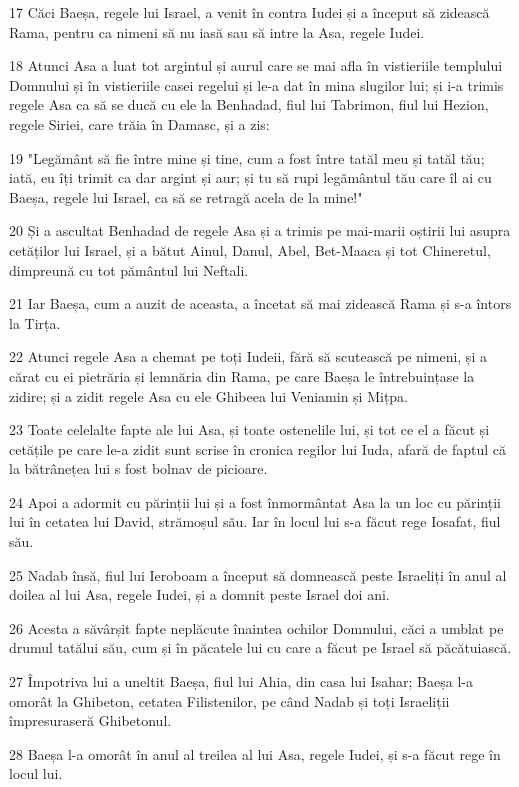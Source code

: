 \par 17 Căci Baeșa, regele lui Israel, a venit în contra Iudei și a început să zidească Rama, pentru ca nimeni să nu iasă sau să intre la Asa, regele Iudei.
\par 18 Atunci Asa a luat tot argintul și aurul care se mai afla în vistieriile templului Domnului și în vistieriile casei regelui și le-a dat în mina slugilor lui; și i-a trimis regele Asa ca să se ducă cu ele la Benhadad, fiul lui Tabrimon, fiul lui Hezion, regele Siriei, care trăia în Damasc, și a zis:
\par 19 "Legământ să fie între mine și tine, cum a fost între tatăl meu și tatăl tău; iată, eu îți trimit ca dar argint și aur; și tu să rupi legământul tău care îl ai cu Baeșa, regele lui Israel, ca să se retragă acela de la mine!"
\par 20 Și a ascultat Benhadad de regele Asa și a trimis pe mai-marii oștirii lui asupra cetăților lui Israel, și a bătut Ainul, Danul, Abel, Bet-Maaca și tot Chineretul, dimpreună cu tot pământul lui Neftali.
\par 21 Iar Baeșa, cum a auzit de aceasta, a încetat să mai zidească Rama și s-a întors la Tirța.
\par 22 Atunci regele Asa a chemat pe toți Iudeii, fără să scutească pe nimeni, și a cărat cu ei pietrăria și lemnăria din Rama, pe care Baeșa le întrebuințase la zidire; și a zidit regele Asa cu ele Ghibeea lui Veniamin și Mițpa.
\par 23 Toate celelalte fapte ale lui Asa, și toate ostenelile lui, și tot ce el a făcut și cetățile pe care le-a zidit sunt scrise în cronica regilor lui Iuda, afară de faptul că la bătrânețea lui s fost bolnav de picioare.
\par 24 Apoi a adormit cu părinții lui și a fost înmormântat Asa la un loc cu părinții lui în cetatea lui David, strămoșul său. Iar în locul lui s-a făcut rege Iosafat, fiul său.
\par 25 Nadab însă, fiul lui Ieroboam a început să domnească peste Israeliți în anul al doilea al lui Asa, regele Iudei, și a domnit peste Israel doi ani.
\par 26 Acesta a săvârșit fapte neplăcute înaintea ochilor Domnului, căci a umblat pe drumul tatălui său, cum și în păcatele lui cu care a făcut pe Israel să păcătuiască.
\par 27 Împotriva lui a uneltit Baeșa, fiul lui Ahia, din casa lui Isahar; Baeșa l-a omorât la Ghibeton, cetatea Filistenilor, pe când Nadab și toți Israeliții împresuraseră Ghibetonul.
\par 28 Baeșa l-a omorât în anul al treilea al lui Asa, regele Iudei, și s-a făcut rege în locul lui.
